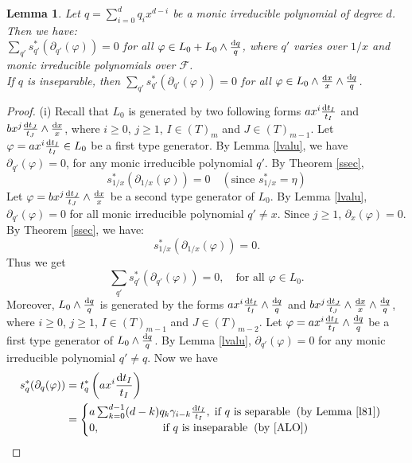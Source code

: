\documentclass[times,10pt]{amsart}
\newcommand{\dd}{{\rm d}}
\newcommand{\F}{\ensuremath{\mathcal{F}}}
\renewcommand{\phi}{\varphi}
\newtheorem{lemma}[thm]{Lemma}%
\begin{document}
 \begin{lemma}\label{l85}
     Let $q=\sum_{i=0}^{d} q_ix^{d-i}$ be a monic  irreducible polynomial of degree $d$. Then we have:\\
      $\sum_{q'} s_{q'}^*( \partial_{q'}(\phi))=0$ for all $\phi\in L_0+ L_0\wedge \frac{\dd q}{q}$, where $q'$ varies over $1/x$ and monic irreducible polynomials over $\F$.\\
      If $q$ is inseparable, then  $\sum_{q'}s_{q'}^*( \partial_{q'}(\phi))=0$ for all $\phi\in L_0\wedge \frac{\dd x}{x}\wedge \frac{\dd q}{q}$.
 \end{lemma}
 \begin{proof}
     (i)    Recall that $L_0$ is generated by   two following forms   $ ax^i \frac{\dd t_I}{t_I}$ and $bx^j \frac{\dd t_J}{t_J}\wedge \frac{\dd x}{x}$, where $i\geq 0$, $j\geq 1$, $I\in (T)_m$ and $J\in (T)_{m-1}$.  Let $\phi= ax^i \frac{\dd t_I}{t_I}\in L_0$  be a first type generator.  By  Lemma \ref{lvalu},   we have $ \partial_{q'}(\phi)=0$, for any monic irreducible polynomial $q'$.  By Theorem \ref{ssec},   $$  s_{1/x}^*(\partial_{1/x}(\phi))=0\quad (\text{since $s^*_{1/x}=\eta$} )$$Let $\phi= bx^j \frac{\dd t_J}{t_J}\wedge \frac{\dd x}{x}$ be a second type generator of $L_0$. By Lemma \ref{lvalu}, $\partial_{q'}(\phi)=0$ for all monic irreducible polynomial $q'\neq x$. Since $j\geq 1$, $\partial_x(\phi)=0$. By Theorem \ref{ssec}, we have: $$ s_{1/x}^*(\partial_{1/x}(\phi))=0.$$  Thus we get $$ \sum_{q'} s^*_{q'}(\partial_{q'}(\phi))=0, \quad \text{for all } \phi\in L_0.$$
     Moreover, $L_0\wedge \frac{\dd q}{q}$ is generated by    the forms $  ax^i \frac{\dd t_I}{t_I}\wedge \frac{\dd q}{q}$ and $bx^j \frac{\dd t_J}{t_J}\wedge \frac{\dd x}{x}\wedge \frac{\dd q}{q}$, where $i\geq 0$, $j\geq 1$, $I\in (T)_{m-1}$ and $J\in (T)_{m-2}$.  Let $\phi= ax^i \frac{\dd t_I}{t_I}\wedge \frac{\dd q}{q}$ be a first type generator of $L_0\wedge \frac{\dd q}{q}$.      By Lemma \ref{lvalu}, $ \partial_{q'}(\phi)=0$  for any monic irreducible polynomial $q'\neq q$.   Now we have \begin{align*}
         s_q^*(\partial_q(\phi))&= t_q^*\left(  ax^i \frac{\dd t_I}{t_I}\right)\\&= \begin{cases}
            a \sum_{k=0}^{d-1}(d-k)q_k\gamma_{i-k}\frac{\dd t_I}{t_I},\hspace{1mm}\text{if $q$ is separable}\hspace{2mm}\text{(by Lemma \ref{l81})}\\0,\hspace{20mm}\text{if $q$ is inseparable}\hspace{2mm} \text{(by \cite[Proposition 3.4]{ALO})}

\end{cases}
\end{align*}
\end{proof}
\end{document}
